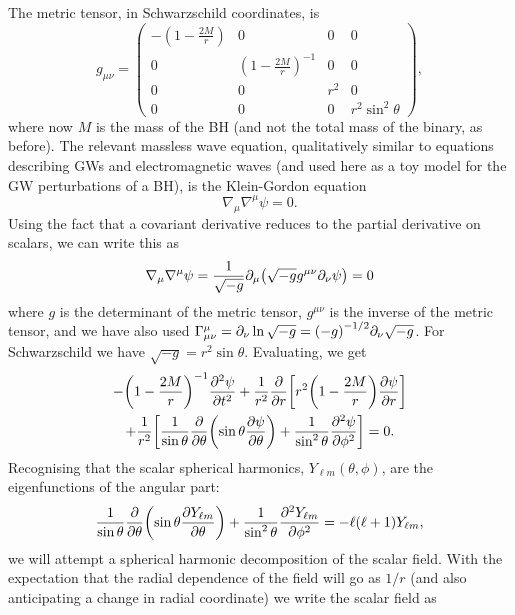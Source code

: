 The metric tensor, in Schwarzschild coordinates, is
\begin{equation}
g_{\mu\nu} = \begin{pmatrix}
- \left(1 - \frac{2M}{r}\right) & 0 & 0 & 0 \\
0 & \left(1 - \frac{2M}{r}\right)^{-1} & 0 & 0 \\
0 & 0 & r^2 & 0 \\
0 & 0 & 0 & r^2 \sin^2\theta
\end{pmatrix},
\end{equation}
where now $M$ is the mass of the BH (and not the total mass of the binary, as before). 
The relevant massless wave equation, qualitatively similar to equations describing GWs and electromagnetic waves (and used here as a toy model for the GW perturbations of a BH), is the Klein-Gordon equation 
\begin{equation}
    \nabla_\mu \nabla^\mu \psi = 0.
\end{equation}
Using the fact that a covariant derivative reduces to the partial derivative on scalars, we can write this as
\begin{equation}
    \nabla_\mu \nabla^\mu \psi = \frac{1}{\sqrt{-g}} \partial_\mu \qty(\sqrt{-g} g^{\mu\nu} \partial_\nu \psi) = 0
\end{equation}
where $g$ is the determinant of the metric tensor, $g^{\mu\nu}$ is the inverse of the metric tensor, and we have also used $\Gamma^\mu_{\mu\nu} = \partial_\nu \ln{\sqrt{-g}} = \qty(-g)^{-1/2} \partial_\nu \sqrt{-g}$.
For Schwarzschild we have $\sqrt{-g} = r^2 \sin{\theta}$.
Evaluating, we get
\begin{multline}
    - \qty(1 - \frac{2M}{r})^{-1} \pdv[2]{\psi}{t} + \frac{1}{r^2} \pdv{r} \qty[r^2 \qty(1 - \frac{2M}{r}) \pdv{\psi}{r} ]\\
    + \frac{1}{r^2} \qty[ \frac{1}{\sin{\theta}} \pdv{\theta} \qty(\sin{\theta} \pdv{\psi}{\theta} ) + \frac{1}{\sin^2{\theta}} \pdv[2]{\psi}{\phi} ] = 0.
\end{multline}
Recognising that the scalar spherical harmonics, $Y_{\ell m}(\theta,\phi)$, are the eigenfunctions of the angular part:
\begin{equation}
    \frac{1}{\sin{\theta}} \pdv{\theta} \qty(\sin{\theta} \pdv{Y_{\ell m}}{\theta} ) + \frac{1}{\sin^2{\theta}} \pdv[2]{Y_{\ell m}}{\phi} = - \ell (\ell + 1) Y_{\ell m},
\end{equation}
we will attempt a spherical harmonic decomposition of the scalar field. 
With the expectation that the radial dependence of the field will go as $1/r$ (and also anticipating a change in radial coordinate) we write the scalar field as
